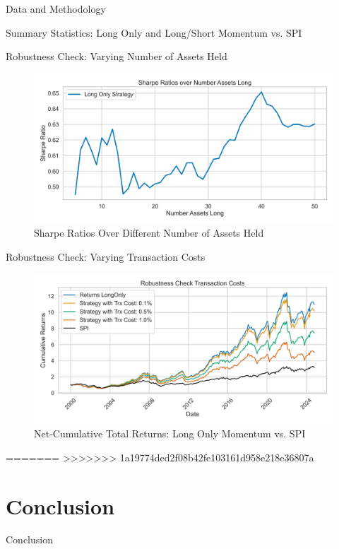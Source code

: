 \documentclass[10pt]{beamer}
\begin{document}
\begin{frame}[fragile]{Data and Methodology}
\begin{frame}{Summary Statistics: Long Only and Long/Short Momentum vs. SPI}
\begin{frame}{Robustness Check: Varying Number of Assets Held}
  \begin{figure}
   \caption{Sharpe Ratios Over Different Number of Assets Held}
        \centering
        \includegraphics[width=\linewidth]{figures/rc_number_assets.png}
    \end{figure}
\end{frame}

\begin{frame}{Robustness Check: Varying Transaction Costs}
  \begin{figure}
   \caption{Net-Cumulative Total Returns: Long Only Momentum vs. SPI}
        \centering
        \includegraphics[width=\linewidth]{figures/rc_trxCost.png}
    \end{figure}
\end{frame}
=======
>>>>>>> 1a19774ded2f08b42fe103161d958e218e36807a

\section{Conclusion}
\begin{frame}{Conclusion}


\end{frame}
\end{frame}
\end{frame}
\end{document}
